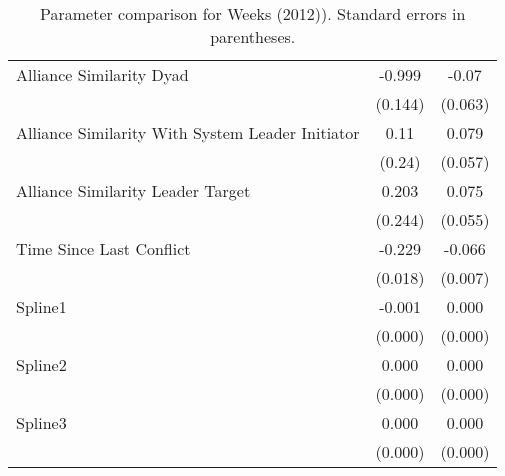 \begin{table}[ht]
\begin{tabular}{lcc}
  Alliance Similarity Dyad  & -0.999 & -0.07 \\ 
   & (0.144) & (0.063) \\ 
  Alliance Similarity With System Leader Initiator & 0.11 & 0.079 \\ 
   & (0.24) & (0.057) \\ 
  Alliance Similarity Leader Target & 0.203 & 0.075 \\ 
   & (0.244) & (0.055) \\ 
  Time Since Last Conflict & -0.229 & -0.066 \\ 
   & (0.018) & (0.007) \\ 
  Spline1 & -0.001 & 0.000 \\ 
   & (0.000) & (0.000) \\ 
  Spline2 & 0.000 & 0.000 \\ 
   & (0.000) & (0.000) \\ 
  Spline3 & 0.000 & 0.000 \\ 
   & (0.000) & (0.000) \\ 
   \hline
\hline
\end{tabular}
\endgroup
\caption{Parameter comparison for Weeks (2012)). Standard errors in parentheses.} 
\label{tab:appendix_tableB2_coef}
\end{table}
